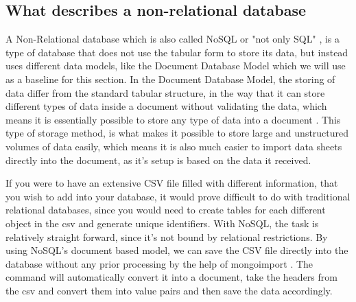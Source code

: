 \subsection{What describes a non-relational database}
\label{sec:what-describes-a-non-relational-database}
A Non-Relational database which is also called NoSQL or "not only SQL" \parencite{mongodb-what-is-nosql}, is a type of database that does not use the tabular form to store its data, but instead uses different data models, like the Document Database Model which we will use as a baseline for this section.
In the Document Database Model, the storing of data differ from the standard tabular structure, in the way that it can store different types of data inside a document without validating the data, which means it is essentially possible to store any type of data into a document \parencite{mongodb-non-relational-database}.
This type of storage method, is what makes it possible to store large and unstructured volumes of data easily, which means it is also much easier to import data sheets directly into the document, as it's setup is based on the data it received.

If you were to have an extensive CSV file filled with different information, that you wish to add into your database, it would prove difficult to do with traditional relational databases, since you would need to create tables for each different object in the csv and generate unique identifiers.
With NoSQL, the task is relatively straight forward, since it's not bound by relational restrictions. By using NoSQL's document based model, we can save the CSV file directly into the database without any prior processing by the help of mongoimport \parencite{databaseguide-mongo-csv}. The command will automatically convert it into a document, take the headers from the csv and convert them into value pairs and then save the data accordingly.